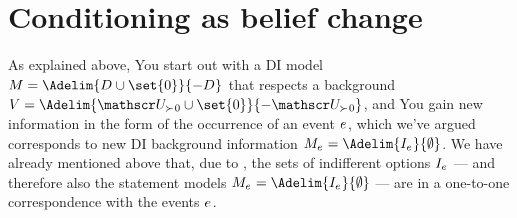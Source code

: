 \documentclass[preprint]{isipta2025}
\begin{document}
\section{Conditioning as belief change}\label{sec::conditioning}
As explained above, You start out with a DI model \(\M=\Adelim{\desirset\cup\set{0}}{-\desirset}\) that respects a background \(\bgM=\Adelim{\posopts\cup\set{0}}{-\posopts}\), and You gain new information in the form of the occurrence of an event \(e_{}\), which we've argued corresponds to new DI background information \(\eventM=\Adelim{\eventindifset}{\emptyset}\).
We have already mentioned above that, due to , the sets of indifferent options \(I_{{e_{}}}\) --- and therefore also the statement models \(\eventM=\Adelim{\eventindifset}{\emptyset}\) --- are in a one-to-one correspondence with the events \(e_{}\).
\end{document}
